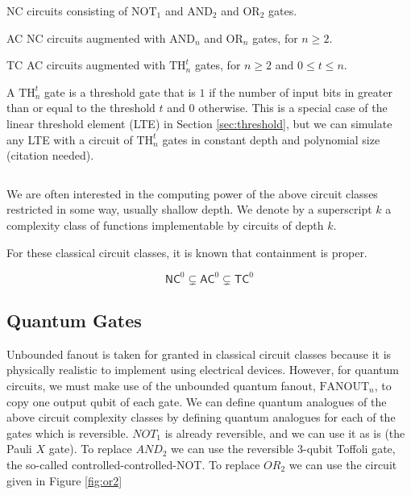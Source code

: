 \begin{definition}
\item[\textsf{NC}]
circuits consisting of $\text{NOT}_1$ and $\text{AND}_2$ and
$\text{OR}_2$ gates.
\item[\textsf{AC}]
NC circuits augmented with $\text{AND}_n$ and $\text{OR}_n$ gates,
for $n \ge 2$.
\item[\textsf{TC}]
AC circuits augmented with $\text{TH}_n^t$ gates, for $n \ge 2$ and
$0 \le t \le n$.
\end{definition}

A $\text{TH}^t_n$ gate is a threshold gate that is $1$ if the number
of input bits in greater than or equal to the threshold $t$ and $0$
otherwise. This is a special case of the linear threshold element (LTE)
in Section \ref{sec:threshold}, but we can simulate any
LTE with a circuit of $\text{TH}^t_n$ gates in constant depth
and polynomial size (citation needed).

\begin{equation}
\end{equation}

We are often interested in the computing power of the above
circuit classes restricted in some way, usually shallow depth.
We denote by a superscript $k$ a complexity class of
functions implementable by circuits of depth $k$.

For these classical circuit classes, it is known that containment
is proper.

\begin{equation}
\textsf{NC}^0 \subsetneq \textsf{AC}^0 \subsetneq \textsf{TC}^0
\end{equation}

\subsection{Quantum Gates}

Unbounded fanout is taken for granted in classical circuit classes
because it is physically realistic to implement using electrical
devices. However, for quantum circuits, we must make use of the
unbounded quantum fanout, $\text{FANOUT}_n$, to copy one output
qubit of each gate.
We can define quantum analogues of the above circuit complexity 
classes by defining quantum analogues for each of the gates which
is reversible.
$NOT_1$ is already reversible, and we can use it as is (the Pauli $X$ gate).
To replace $AND_2$ we can use the reversible $3$-qubit Toffoli gate,
the so-called controlled-controlled-NOT.
To replace $OR_2$ we can use the circuit given in
Figure \ref{fig:or2}

